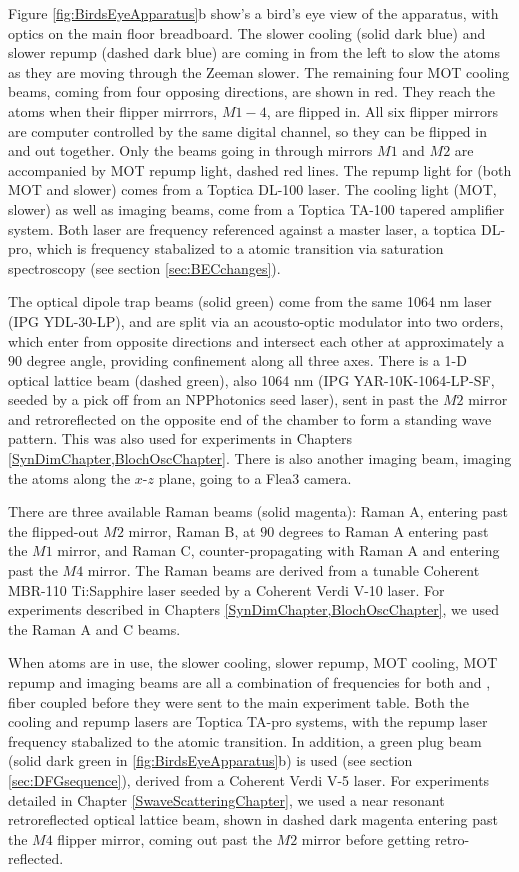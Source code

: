 Figure \ref{fig:BirdsEyeApparatus}b show's a bird's eye view of the apparatus, with optics on the main floor breadboard. The slower cooling (solid dark blue) and slower repump (dashed dark blue) are coming in from the left to slow the atoms as they are moving through the Zeeman slower. The remaining four MOT cooling beams, coming from four opposing directions, are shown in red.  They reach the atoms when their flipper mirrrors, $M1-4$, are flipped in. All six flipper mirrors are computer controlled by the same digital channel, so they can be flipped in and out together. Only the beams going in through mirrors $M1$ and $M2$ are accompanied by MOT repump light, dashed red lines. The repump light for \Rb{} (both MOT and slower) comes from a Toptica DL-100 laser. The cooling light (MOT, slower) as well as imaging beams, come from a Toptica TA-100 tapered amplifier system. Both laser are frequency referenced against a master laser, a toptica DL-pro, which is frequency stabalized to a \Rb{} atomic transition via saturation spectroscopy (see section \ref{sec:BECchanges}).

The optical dipole trap beams (solid green) come from the same 1064 nm laser (IPG YDL-30-LP), and are split via an acousto-optic modulator into two orders, which enter from opposite directions and intersect each other at approximately a $90$ degree angle, providing confinement along all three axes.  There is a 1-D optical lattice beam (dashed green), also 1064 nm (IPG YAR-10K-1064-LP-SF, seeded by a pick off from an NPPhotonics seed laser), sent in past the $M2$ mirror and retroreflected on the opposite end of the chamber to form a standing wave pattern. This was also used for experiments in Chapters \ref{SynDimChapter,BlochOscChapter}. There is also another imaging beam, imaging the atoms along the $x$-$z$ plane, going to a Flea3 camera. 

There are three available Raman beams (solid magenta): Raman A, entering past the flipped-out $M2$ mirror, Raman B, at $90$ degrees to Raman A entering past the $M1$ mirror, and Raman C, counter-propagating with Raman A and entering past the $M4$ mirror. The Raman beams are derived from a tunable Coherent MBR-110 Ti:Sapphire laser seeded by a Coherent Verdi V-10 laser. For experiments described in Chapters \ref{SynDimChapter,BlochOscChapter}, we used the Raman A and C beams.

When \K{} atoms are in use, the slower cooling, slower repump, MOT cooling, MOT repump and imaging beams are all a combination of frequencies for both \Rb{} and \K{}, fiber coupled before they were sent to the main experiment table. Both the \K{} cooling and repump lasers are Toptica TA-pro systems, with the repump laser frequency stabalized to the \K{} atomic transition. In addition, a green plug beam (solid dark green in \ref{fig:BirdsEyeApparatus}b) is used (see section \ref{sec:DFGsequence}), derived from a Coherent Verdi V-5 laser. For \K{} experiments detailed in Chapter \ref{SwaveScatteringChapter}, we used a near resonant retroreflected optical lattice beam, shown in dashed dark magenta entering past the $M4$ flipper mirror, coming out past the $M2$ mirror before getting retro-reflected.

